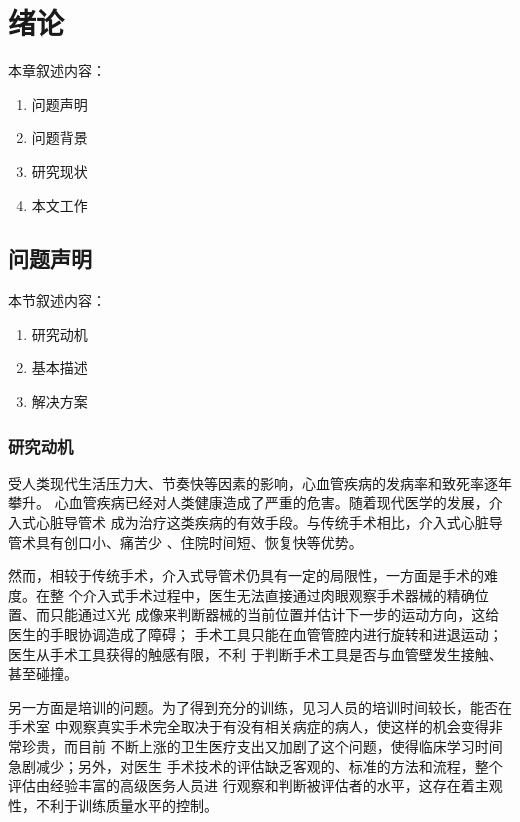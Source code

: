 \chapter{绪\;\;\;论}
\label{chap1}

本章叙述内容：
\begin{enumerate}
  \item 问题声明\cite{liu2003survey}
  \item 问题背景\cite{basdogan2007vr}
  \item 研究现状\cite{preim20083d}
  \item 本文工作\cite{lin1998collision}
\end{enumerate}

\section{问题声明}
\label{sec1-1}

本节叙述内容：
\begin{enumerate}
  \item 研究动机\cite{azuma1997survey}
  \item 基本描述\cite{meier2005deformable}
  \item 解决方案
\end{enumerate}

\subsection{研究动机}
\label{subsec1-1-1}

受人类现代生活压力大、节奏快等因素的影响，心血管疾病的发病率和致死率逐年攀升。
心血管疾病已经对人类健康造成了严重的危害。随着现代医学的发展，介入式心脏导管术
成为治疗这类疾病的有效手段。与传统手术相比，介入式心脏导管术具有创口小、痛苦少
、住院时间短、恢复快等优势。

然而，相较于传统手术，介入式导管术仍具有一定的局限性，一方面是手术的难度。在整
个介入式手术过程中，医生无法直接通过肉眼观察手术器械的精确位置、而只能通过X光
成像来判断器械的当前位置并估计下一步的运动方向，这给医生的手眼协调造成了障碍；
手术工具只能在血管管腔内进行旋转和进退运动；医生从手术工具获得的触感有限，不利
于判断手术工具是否与血管壁发生接触、甚至碰撞。

另一方面是培训的问题。为了得到充分的训练，见习人员的培训时间较长，能否在手术室
中观察真实手术完全取决于有没有相关病症的病人，使这样的机会变得非常珍贵，而目前
不断上涨的卫生医疗支出又加剧了这个问题，使得临床学习时间急剧减少；另外，对医生
手术技术的评估缺乏客观的、标准的方法和流程，整个评估由经验丰富的高级医务人员进
行观察和判断被评估者的水平，这存在着主观性，不利于训练质量水平的控制。

